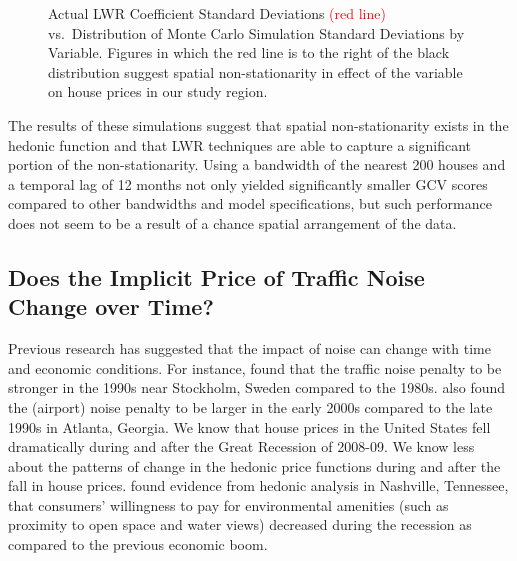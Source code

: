\documentclass{article}\usepackage{graphicx, color}
\begin{document}
\begin{figure}
 \caption{Actual LWR Coefficient Standard Deviations \textcolor{red}{(red line)} vs.\ Distribution of Monte Carlo Simulation Standard Deviations by Variable. Figures in which the red line is to the right of the black distribution suggest spatial non-stationarity in effect of the variable on house prices in our study region.}\label{fig:MCsds}
\end{figure}

The results of these simulations suggest that spatial non-stationarity exists in the hedonic function and that LWR techniques are able to capture a significant portion of the non-stationarity. Using a bandwidth of the nearest 200 houses and a temporal lag of 12 months not only yielded significantly smaller GCV scores compared to other bandwidths and model specifications, but such performance does not seem to be a result of a chance spatial arrangement of the data.

\subsection{Does the Implicit Price of Traffic Noise Change over Time?}

Previous research has suggested that the impact of noise can change with time and economic conditions. For instance, \citet{Wilhelmsson2000} found that the traffic noise penalty to be stronger in the 1990s near Stockholm, Sweden compared to the 1980s. \citet{Cohen2009} also found the (airport) noise penalty to be larger in the early 2000s compared to the late 1990s in Atlanta, Georgia. We know that house prices in the United States fell dramatically during and after the Great Recession of 2008-09. We know less about the patterns of change in the hedonic price functions during and after the fall in house prices. \citet{Cho2011b} found evidence from hedonic analysis in Nashville, Tennessee,  that consumers' willingness to pay for environmental amenities (such as proximity to open space and water views) decreased during the recession as compared to the previous economic boom. 
\end{document}
